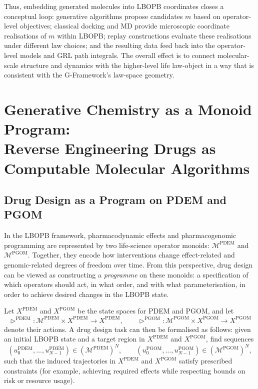 \documentclass[11pt]{book}
\theoremstyle{plain}
\theoremstyle{definition}
\theoremstyle{remark}
\begin{document}
Thus, embedding generated molecules into LBOPB coordinates closes a
conceptual loop: generative algorithms propose candidates $m$ based on
operator-level objectives; classical docking and MD provide microscopic
coordinate realisations of $m$ within LBOPB; replay constructions
evaluate these realisations under different law choices; and the
resulting data feed back into the operator-level models and GRL path
integrals. The overall effect is to connect molecular-scale structure
and dynamics with the higher-level life law-object in a way that is
consistent with the G-Framework’s law-space geometry.

\chapter[Generative Chemistry as a Monoid Program]{Generative Chemistry as a Monoid Program:\\
         Reverse Engineering Drugs as Computable Molecular Algorithms}


\section{Drug Design as a Program on PDEM and PGOM}


In the LBOPB framework, pharmacodynamic effects and pharmacogenomic
programming are represented by two life-science operator monoids:
$\mathcal{M}^{\mathrm{PDEM}}$ and $\mathcal{M}^{\mathrm{PGOM}}$.
Together, they encode how interventions change effect-related and
genomic-related degrees of freedom over time. From this perspective,
drug design can be viewed as constructing a \emph{programme} on these
monoids: a specification of which operators should act, in what order,
and with what parameterisation, in order to achieve desired changes in
the LBOPB state.

Let $X^{\mathrm{PDEM}}$ and $X^{\mathrm{PGOM}}$ be the state spaces
for PDEM and PGOM, and let
\[
  \triangleright^{\mathrm{PDEM}} \colon
  \mathcal{M}^{\mathrm{PDEM}} \times X^{\mathrm{PDEM}} \to X^{\mathrm{PDEM}},
  \qquad
  \triangleright^{\mathrm{PGOM}} \colon
  \mathcal{M}^{\mathrm{PGOM}} \times X^{\mathrm{PGOM}} \to X^{\mathrm{PGOM}}
\]
denote their actions. A drug design task can then be formalised as
follows: given an initial LBOPB state and a target region in
$X^{\mathrm{PDEM}}$ and $X^{\mathrm{PGOM}}$, find sequences
\[
  (u^{\mathrm{PDEM}}_{0},\dots,u^{\mathrm{PDEM}}_{N-1})
  \in (\mathcal{M}^{\mathrm{PDEM}})^{N},
  \qquad
  (u^{\mathrm{PGOM}}_{0},\dots,u^{\mathrm{PGOM}}_{N-1})
  \in (\mathcal{M}^{\mathrm{PGOM}})^{N},
\]
such that the induced trajectories in $X^{\mathrm{PDEM}}$ and
$X^{\mathrm{PGOM}}$ satisfy prescribed constraints (for example,
achieving required effects while respecting bounds on risk or resource
usage).
\end{document}
